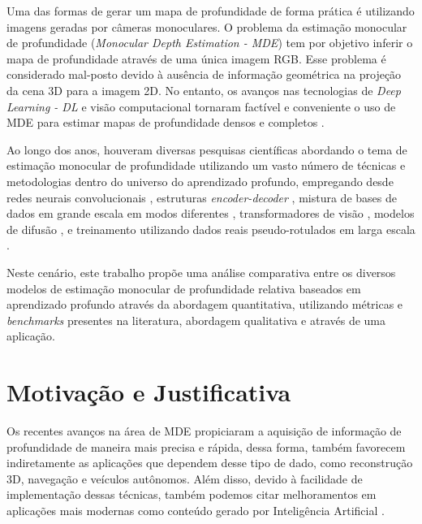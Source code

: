 Uma das formas de gerar um mapa de profundidade de forma prática é utilizando imagens geradas por câmeras monoculares. O problema da estimação monocular de profundidade (\textit{Monocular Depth Estimation - MDE}) tem por objetivo inferir o mapa de profundidade através de uma única imagem RGB. Esse problema é considerado mal-posto devido à ausência de informação geométrica na projeção da cena 3D para a imagem 2D. No entanto, os avanços nas tecnologias de \textit{Deep Learning - DL} e visão computacional tornaram factível e conveniente o uso de MDE para estimar mapas de profundidade densos e completos \cite{spencer2024third} \cite{rajapaksha2024deep}. 

Ao longo dos anos, houveram diversas pesquisas científicas abordando o tema de estimação monocular de profundidade utilizando um vasto número de técnicas e metodologias dentro do universo do aprendizado profundo, empregando desde redes neurais convolucionais \cite{kopf2021robust}, estruturas \textit{encoder-decoder} \cite{godard2019digging}, mistura de bases de dados em grande escala em modos diferentes \cite{lasinger2019towards}, transformadores de visão \cite{birkl2023midas}, modelos de difusão \cite{ke2024repurposing}, e treinamento utilizando dados reais pseudo-rotulados em larga escala \cite{yang2024depth}. 

Neste cenário, este trabalho propõe uma análise comparativa entre os diversos modelos de estimação monocular de profundidade relativa baseados em aprendizado profundo através da abordagem quantitativa, utilizando métricas e \textit{benchmarks} presentes na literatura, abordagem qualitativa e através de uma aplicação. 



\section{Motivação e Justificativa} 

Os recentes avanços na área de MDE propiciaram a aquisição de informação de profundidade de maneira mais precisa e rápida, dessa forma, também favorecem indiretamente as aplicações que dependem desse tipo de dado, como reconstrução 3D, navegação e veículos autônomos. Além disso, devido à facilidade de implementação dessas técnicas, também podemos citar melhoramentos em aplicações mais modernas como conteúdo gerado por Inteligência Artificial \cite{yang2024depth}.


